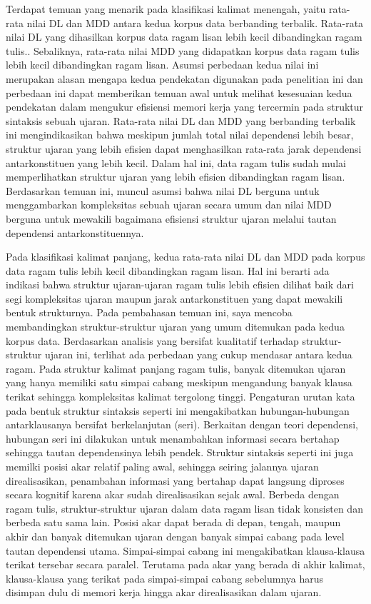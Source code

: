 Terdapat temuan yang menarik pada klasifikasi kalimat menengah, yaitu rata-rata nilai DL dan MDD antara kedua korpus data berbanding terbalik. Rata-rata nilai DL yang dihasilkan korpus data ragam lisan lebih kecil dibandingkan ragam tulis.. Sebaliknya, rata-rata nilai MDD yang didapatkan korpus data ragam tulis lebih kecil dibandingkan ragam lisan. Asumsi perbedaan kedua nilai ini merupakan alasan mengapa kedua pendekatan digunakan pada penelitian ini dan perbedaan ini dapat memberikan temuan awal untuk melihat kesesuaian kedua pendekatan dalam mengukur efisiensi memori kerja yang tercermin pada struktur sintaksis sebuah ujaran. Rata-rata nilai DL dan MDD yang berbanding terbalik ini mengindikasikan bahwa meskipun jumlah total nilai dependensi lebih besar, struktur ujaran yang lebih efisien dapat menghasilkan rata-rata jarak dependensi antarkonstituen yang lebih kecil. Dalam hal ini, data ragam tulis sudah mulai memperlihatkan struktur ujaran yang lebih efisien dibandingkan ragam lisan. Berdasarkan temuan ini, muncul asumsi bahwa nilai DL berguna untuk menggambarkan kompleksitas sebuah ujaran secara umum dan nilai MDD berguna untuk mewakili bagaimana efisiensi struktur ujaran melalui tautan dependensi antarkonstituennya.

Pada klasifikasi kalimat panjang, kedua rata-rata nilai DL dan MDD pada korpus data ragam tulis lebih kecil dibandingkan ragam lisan. Hal ini berarti ada indikasi bahwa struktur ujaran-ujaran ragam tulis lebih efisien dilihat baik dari segi kompleksitas ujaran maupun jarak antarkonstituen yang dapat mewakili bentuk strukturnya. Pada pembahasan temuan ini, saya mencoba membandingkan struktur-struktur ujaran yang umum ditemukan pada kedua korpus data. Berdasarkan analisis yang bersifat kualitatif terhadap struktur-struktur ujaran ini, terlihat ada perbedaan yang cukup mendasar antara kedua ragam. Pada struktur kalimat panjang ragam tulis, banyak ditemukan ujaran yang hanya memiliki satu simpai cabang meskipun mengandung banyak klausa terikat sehingga kompleksitas kalimat tergolong tinggi. Pengaturan urutan kata pada bentuk struktur sintaksis seperti ini mengakibatkan hubungan-hubungan antarklausanya bersifat berkelanjutan (seri). Berkaitan dengan teori dependensi, hubungan seri ini dilakukan untuk menambahkan informasi secara bertahap sehingga tautan dependensinya lebih pendek. Struktur sintaksis seperti ini juga memilki posisi akar relatif paling awal, sehingga seiring jalannya ujaran direalisasikan, penambahan informasi yang bertahap dapat langsung diproses secara kognitif karena akar sudah direalisasikan sejak awal. Berbeda dengan ragam tulis, struktur-struktur ujaran dalam data ragam lisan tidak konsisten dan berbeda satu sama lain. Posisi akar dapat berada di depan, tengah, maupun akhir dan banyak ditemukan ujaran dengan banyak simpai cabang pada level tautan dependensi utama. Simpai-simpai cabang ini mengakibatkan klausa-klausa terikat tersebar secara paralel. Terutama pada akar yang berada di akhir kalimat, klausa-klausa yang terikat pada simpai-simpai cabang sebelumnya harus disimpan dulu di memori kerja hingga akar direalisasikan dalam ujaran. 


